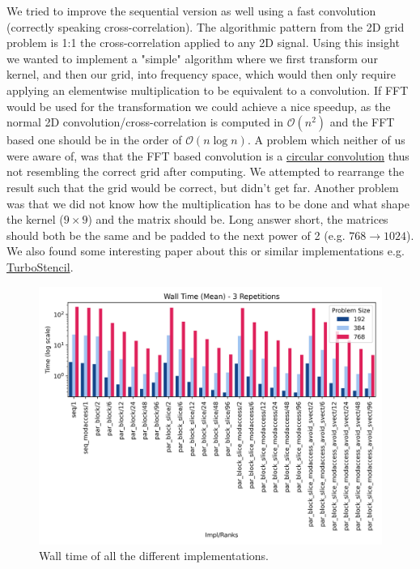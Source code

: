 \documentclass[UTF-8]{article}
\begin{document}
\begin{itemize}
We tried to improve the sequential version as well using a fast convolution (correctly speaking cross-correlation). The algorithmic pattern from the 2D grid problem is 1:1 the cross-correlation applied to any 2D signal. Using this insight we wanted to implement a "simple" algorithm where we first transform our kernel,  and then our grid, into frequency space, which would then only require applying an elementwise multiplication to be equivalent to a convolution. If FFT would be used for the transformation we could achieve a nice speedup, as the normal 2D convolution/cross-correlation is computed in $\mathcal{O}(n^2)$ and the FFT based one should be in the order of $\mathcal{O}(n\log n)$. A problem which neither of us were aware of, was that the FFT based convolution is a \href{https://en.wikipedia.org/wiki/Circular_convolution}{circular convolution} thus not resembling the correct grid after computing. We attempted to rearrange the result such that the grid would be correct, but didn't get far. Another problem was that we did not know how the multiplication has to be done and what shape the kernel ($9 \times 9$) and the matrix should be. Long answer short, the matrices should both be the same and be padded to the next power of 2 (e.g. $768 \rightarrow 1024$). 
We also found some interesting paper about this or similar implementations e.g. \href{https://www.sciencedirect.com/science/article/pii/S0167739X2300153X}{TurboStencil}.


 	
\begin{figure}[H]
	\centering
	\includegraphics[width=0.9\linewidth]{images/measurements_wall_time}
	\caption{Wall time of all the different implementations.}
	\label{fig:measurementswalltime}
\end{figure}


\end{itemize}
\end{document}
